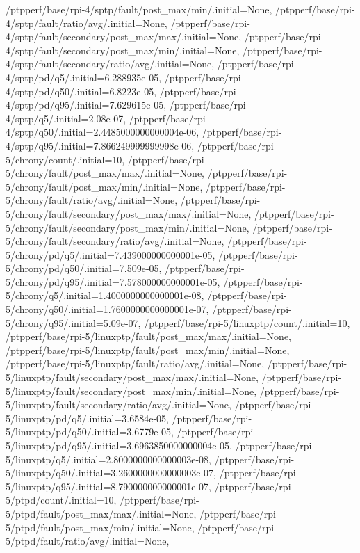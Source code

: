 {    /ptpperf/base/rpi-4/sptp/fault/post_max/min/.initial=None,
    /ptpperf/base/rpi-4/sptp/fault/ratio/avg/.initial=None,
    /ptpperf/base/rpi-4/sptp/fault/secondary/post_max/max/.initial=None,
    /ptpperf/base/rpi-4/sptp/fault/secondary/post_max/min/.initial=None,
    /ptpperf/base/rpi-4/sptp/fault/secondary/ratio/avg/.initial=None,
    /ptpperf/base/rpi-4/sptp/pd/q5/.initial=6.288935e-05,
    /ptpperf/base/rpi-4/sptp/pd/q50/.initial=6.8223e-05,
    /ptpperf/base/rpi-4/sptp/pd/q95/.initial=7.629615e-05,
    /ptpperf/base/rpi-4/sptp/q5/.initial=2.08e-07,
    /ptpperf/base/rpi-4/sptp/q50/.initial=2.4485000000000004e-06,
    /ptpperf/base/rpi-4/sptp/q95/.initial=7.866249999999998e-06,
    /ptpperf/base/rpi-5/chrony/count/.initial=10,
    /ptpperf/base/rpi-5/chrony/fault/post_max/max/.initial=None,
    /ptpperf/base/rpi-5/chrony/fault/post_max/min/.initial=None,
    /ptpperf/base/rpi-5/chrony/fault/ratio/avg/.initial=None,
    /ptpperf/base/rpi-5/chrony/fault/secondary/post_max/max/.initial=None,
    /ptpperf/base/rpi-5/chrony/fault/secondary/post_max/min/.initial=None,
    /ptpperf/base/rpi-5/chrony/fault/secondary/ratio/avg/.initial=None,
    /ptpperf/base/rpi-5/chrony/pd/q5/.initial=7.439000000000001e-05,
    /ptpperf/base/rpi-5/chrony/pd/q50/.initial=7.509e-05,
    /ptpperf/base/rpi-5/chrony/pd/q95/.initial=7.578000000000001e-05,
    /ptpperf/base/rpi-5/chrony/q5/.initial=1.4000000000000001e-08,
    /ptpperf/base/rpi-5/chrony/q50/.initial=1.7600000000000001e-07,
    /ptpperf/base/rpi-5/chrony/q95/.initial=5.09e-07,
    /ptpperf/base/rpi-5/linuxptp/count/.initial=10,
    /ptpperf/base/rpi-5/linuxptp/fault/post_max/max/.initial=None,
    /ptpperf/base/rpi-5/linuxptp/fault/post_max/min/.initial=None,
    /ptpperf/base/rpi-5/linuxptp/fault/ratio/avg/.initial=None,
    /ptpperf/base/rpi-5/linuxptp/fault/secondary/post_max/max/.initial=None,
    /ptpperf/base/rpi-5/linuxptp/fault/secondary/post_max/min/.initial=None,
    /ptpperf/base/rpi-5/linuxptp/fault/secondary/ratio/avg/.initial=None,
    /ptpperf/base/rpi-5/linuxptp/pd/q5/.initial=3.6584e-05,
    /ptpperf/base/rpi-5/linuxptp/pd/q50/.initial=3.6779e-05,
    /ptpperf/base/rpi-5/linuxptp/pd/q95/.initial=3.6963850000000004e-05,
    /ptpperf/base/rpi-5/linuxptp/q5/.initial=2.8000000000000003e-08,
    /ptpperf/base/rpi-5/linuxptp/q50/.initial=3.2600000000000003e-07,
    /ptpperf/base/rpi-5/linuxptp/q95/.initial=8.790000000000001e-07,
    /ptpperf/base/rpi-5/ptpd/count/.initial=10,
    /ptpperf/base/rpi-5/ptpd/fault/post_max/max/.initial=None,
    /ptpperf/base/rpi-5/ptpd/fault/post_max/min/.initial=None,
    /ptpperf/base/rpi-5/ptpd/fault/ratio/avg/.initial=None,
}
